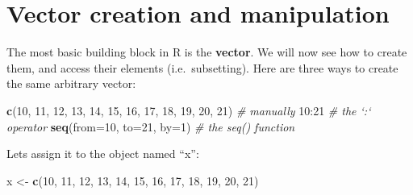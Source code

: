 \documentclass[]{book}
\newenvironment{Shaded}{\begin{snugshade}}{\end{snugshade}}
\newcommand{\KeywordTok}[1]{\textcolor[rgb]{0.13,0.29,0.53}{\textbf{{#1}}}}
\newcommand{\DataTypeTok}[1]{\textcolor[rgb]{0.13,0.29,0.53}{{#1}}}
\newcommand{\DecValTok}[1]{\textcolor[rgb]{0.00,0.00,0.81}{{#1}}}
\newcommand{\FloatTok}[1]{\textcolor[rgb]{0.00,0.00,0.81}{{#1}}}
\newcommand{\StringTok}[1]{\textcolor[rgb]{0.31,0.60,0.02}{{#1}}}
\newcommand{\CommentTok}[1]{\textcolor[rgb]{0.56,0.35,0.01}{\textit{{#1}}}}
\newcommand{\NormalTok}[1]{{#1}}
\theoremstyle{definition}
\theoremstyle{definition}
\theoremstyle{remark}
\begin{document}
\begin{Shaded}
\end{Shaded}

\section{Vector creation and
manipulation}\label{vector-creation-and-manipulation}

The most basic building block in R is the \textbf{vector}. We will now
see how to create them, and access their elements (i.e.~subsetting).
Here are three ways to create the same arbitrary vector:

\begin{Shaded}
\begin{Highlighting}[]
\KeywordTok{c}\NormalTok{(}\DecValTok{10}\NormalTok{, }\DecValTok{11}\NormalTok{, }\DecValTok{12}\NormalTok{, }\DecValTok{13}\NormalTok{, }\DecValTok{14}\NormalTok{, }\DecValTok{15}\NormalTok{, }\DecValTok{16}\NormalTok{, }\DecValTok{17}\NormalTok{, }\DecValTok{18}\NormalTok{, }\DecValTok{19}\NormalTok{, }\DecValTok{20}\NormalTok{, }\DecValTok{21}\NormalTok{) }\CommentTok{# manually}
\DecValTok{10}\NormalTok{:}\DecValTok{21} \CommentTok{# the `:` operator                            }
\KeywordTok{seq}\NormalTok{(}\DataTypeTok{from=}\DecValTok{10}\NormalTok{, }\DataTypeTok{to=}\DecValTok{21}\NormalTok{, }\DataTypeTok{by=}\DecValTok{1}\NormalTok{) }\CommentTok{# the seq() function}
\end{Highlighting}
\end{Shaded}

Lets assign it to the object named ``x'':

\begin{Shaded}
\begin{Highlighting}[]
\NormalTok{x <-}\StringTok{ }\KeywordTok{c}\NormalTok{(}\DecValTok{10}\NormalTok{, }\DecValTok{11}\NormalTok{, }\DecValTok{12}\NormalTok{, }\DecValTok{13}\NormalTok{, }\DecValTok{14}\NormalTok{, }\DecValTok{15}\NormalTok{, }\DecValTok{16}\NormalTok{, }\DecValTok{17}\NormalTok{, }\DecValTok{18}\NormalTok{, }\DecValTok{19}\NormalTok{, }\DecValTok{20}\NormalTok{, }\DecValTok{21}\NormalTok{)  }
\end{Highlighting}
\end{Shaded}
\end{document}
